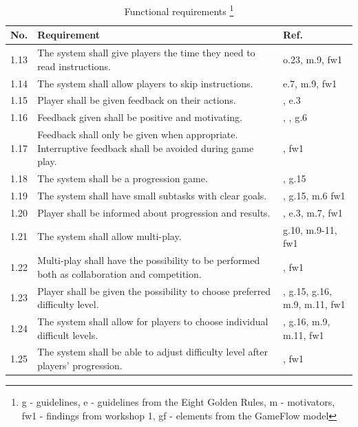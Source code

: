 \begin{minipage}{12 cm}
\begin{table} [H]
\centering
\begin{tabular}{|>{\raggedright}p{}|p{}|p{}|}
\hline
\textbf{No.} & \textbf{Requirement} & \textbf{Ref.} \\ \hline
1.13 & The system shall give players the time they need to read instructions. & o.23, m.9, fw1 \\ \hline 
1.14 & The system shall allow players to skip instructions. & \cite{sweetser} e.7, m.9, fw1 \\ \hline 
1.15 & Player shall be given feedback on their actions. &  \cite{sweetser}, e.3 \\ \hline
1.16 & Feedback given shall be positive and motivating. &  \cite{sweetser}, \cite{project}, g.6 \\ \hline
1.17 & Feedback shall only be given when appropriate. Interruptive feedback shall be avoided during game play. &  \cite{sweetser}, fw1 \\ \hline
1.18 & The system shall be a progression game. & \cite{understandingvg} \cite{sweetser}, g.15 \\ \hline
1.19 & The system shall have small subtasks with clear goals. &  \cite{sweetser} \cite{john2012smartsenior}, g.15, m.6 fw1\\ \hline
1.20 & Player shall be informed about progression and results. & \cite{sweetser} \cite{john2012smartsenior}, e.3, m.7, fw1 \\ \hline
1.21 & The system shall allow multi-play. & g.10, m.9-11, fw1 \\ \hline
1.22 & Multi-play shall have the possibility to be performed both as collaboration and competition. & \cite{sweetser}, fw1\\ \hline
1.23 & Player shall be given the possibility to choose preferred difficulty level. & \cite{sweetser}, g.15, g.16, m.9, m.11, fw1\\ \hline
1.24 & The system shall allow for players to choose individual difficult levels. & \cite{sweetser}, g.16, m.9, m.11, fw1\\ \hline
1.25 & The system shall be able to adjust difficulty level after players' progression. & \cite{sweetser}, fw1 \\ \hline
    \end{tabular}
    \caption[Functional requirements, part 2]{Functional requirements \footnote{g - guidelines, e - guidelines from the Eight Golden Rules, m - motivators, fw1 - findings from workshop 1, gf - elements from the GameFlow model}}
    \label{tab:func2}
\end{table} 
\end{minipage}

